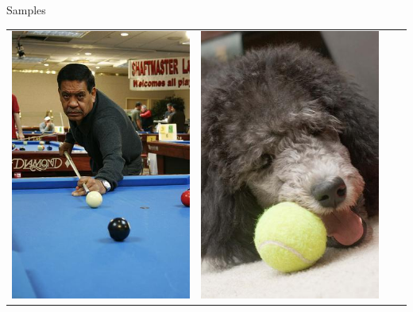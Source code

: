 \documentclass{beamer}
\begin{document}
\begin{frame}{Samples}
\begin{table}[H]
\begin{tabularx}{\textwidth}{@{}cccc@{}}
			\includegraphics[height=\samplesheight]{training_images/positive/n03145719_8658} &
			\includegraphics[height=\samplesheight]{training_images/positive/n04409515_2793} \\

\end{tabularx}
\end{table}
\end{frame}
\end{document}
